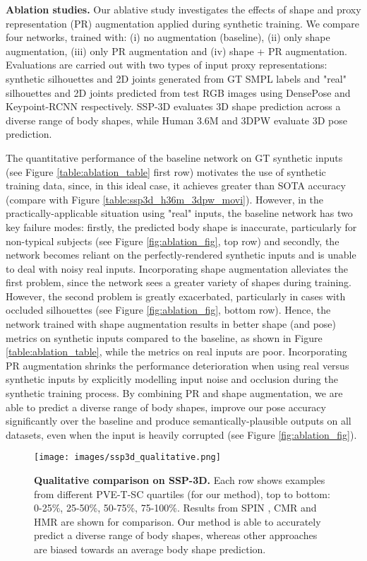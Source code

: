 \documentclass{bmvc2k}
\begin{document}
\noindent \textbf{Ablation studies.} Our ablative study investigates the effects of shape and proxy representation (PR) augmentation applied during synthetic training. We compare four networks, trained with: (i) no augmentation (baseline), (ii) only shape augmentation, (iii) only PR augmentation and (iv) shape + PR augmentation. Evaluations are carried out with two types of input proxy representations: synthetic silhouettes and 2D joints generated from GT SMPL labels and "real" silhouettes and 2D joints predicted from test RGB images using DensePose \cite{Guler2018DensePose} and Keypoint-RCNN \cite{he2017maskrcnn} respectively. SSP-3D evaluates 3D shape prediction across a diverse range of body shapes, while Human 3.6M and 3DPW evaluate 3D pose prediction.

The quantitative performance of the baseline network on GT synthetic inputs (see Figure \ref{table:ablation_table} first row) motivates the use of synthetic training data, since, in this ideal case, it achieves greater than SOTA accuracy (compare with Figure \ref{table:ssp3d_h36m_3dpw_movi}). However, in the practically-applicable situation using "real" inputs, the baseline network has two key failure modes: firstly, the predicted body shape is inaccurate, particularly for non-typical subjects (see Figure \ref{fig:ablation_fig}, top row) and secondly, the network becomes reliant on the perfectly-rendered synthetic inputs and is unable to deal with noisy real inputs. Incorporating shape augmentation alleviates the first problem, since the network sees a greater variety of shapes during training. However, the second problem is greatly exacerbated, particularly in cases with occluded silhouettes (see Figure \ref{fig:ablation_fig}, bottom row). Hence, the network trained with shape augmentation results in better shape (and pose) metrics on synthetic inputs compared to the baseline, as shown in Figure \ref{table:ablation_table}, while the metrics on real inputs are poor. Incorporating PR augmentation shrinks the performance deterioration when using real versus synthetic inputs by explicitly modelling input noise and occlusion during the synthetic training process. By combining PR and shape augmentation, we are able to predict a diverse range of body shapes, improve our pose accuracy significantly over the baseline and produce semantically-plausible outputs on all datasets, even when the input is heavily corrupted (see Figure \ref{fig:ablation_fig}).

\begin{figure}[!t]
    \centering
    \texttt{[image: images/ssp3d\_qualitative.png]}
    \caption{\textbf{Qualitative comparison on SSP-3D.} Each row shows examples from different PVE-T-SC quartiles (for our method), top to bottom: 0-25\%, 25-50\%, 50-75\%, 75-100\%. Results from SPIN \cite{kolotouros2019spin}, CMR \cite{kolotouros2019cmr} and HMR \cite{hmrKanazawa17} are shown for comparison. Our method is able to accurately predict a diverse range of body shapes, whereas other approaches are biased towards an average body shape prediction.}
    \label{fig:ssp3d_qualitative}
    \vspace{-0.2cm}
\end{figure}
\end{document}
